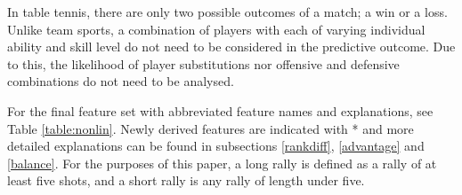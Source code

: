 In table tennis, there are only two possible outcomes of a match; a win or a loss. Unlike team sports, a combination of players with each of varying individual ability and skill level do not need to be considered in the predictive outcome. Due to this, the likelihood of player substitutions nor offensive and defensive combinations do not need to be analysed.

For the final feature set with abbreviated feature names and explanations, see Table \ref{table:nonlin}. Newly derived features are indicated with * and more detailed explanations can be found in subsections \ref{rankdiff}, \ref{advantage} and \ref{balance}. For the purposes of this paper, a long rally is defined as a rally of at least five shots, and a short rally is any rally of length under five.

\begin{table}[ht]
\caption{Feature Summary} %
\centering %
\setlength{\tabcolsep}{3pt}
\label{table:nonlin} %
\end{table}

